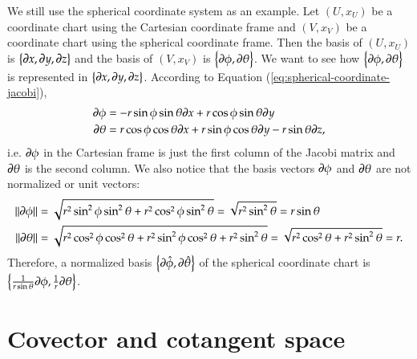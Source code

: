 \documentclass[11pt, a4paper]{book}
\begin{document}
\begin{Example}
  \label{exam:spherical-coordinate-basis}
  We still use the spherical coordinate system as an example. Let $(U,x_U)$ be a
  coordinate chart using the Cartesian coordinate frame and $(V,x_V)$ be a coordinate
  chart using the spherical coordinate frame. Then the basis of $(U,x_U)$ is
  $\left\{ \boldsymbol{\partial}x, \boldsymbol{\partial}y, \boldsymbol{\partial}z \right\}$ and the basis of
  $(V,x_V)$ is $\left\{ \boldsymbol{\partial}\phi, \boldsymbol{\partial}\theta \right\}$. We want to see
  how $\left\{ \boldsymbol{\partial}\phi, \boldsymbol{\partial}\theta \right\}$ is represented in $\left\{
    \boldsymbol{\partial}x, \boldsymbol{\partial}y, \boldsymbol{\partial}z \right\}$. According to Equation
  (\ref{eq:spherical-coordinate-jacobi}),
  \begin{equation}
    \begin{aligned}
      \boldsymbol{\partial}\phi &= -r\sin\phi \sin\theta \boldsymbol{\partial}x + r\cos\phi \sin\theta
      \boldsymbol{\partial}y \\
      \boldsymbol{\partial}\theta &= r\cos\phi\cos\theta \boldsymbol{\partial}x + r\sin\phi\cos\theta
      \boldsymbol{\partial}y - r\sin\theta \boldsymbol{\partial}z,
    \end{aligned}
  \end{equation}
  i.e. $\boldsymbol{\partial}\phi$ in the Cartesian frame is just the first column of the Jacobi
  matrix and $\boldsymbol{\partial}\theta$ is the second column. We also notice that the basis
  vectors $\boldsymbol{\partial}\phi$ and $\boldsymbol{\partial}\theta$ are not
  normalized or unit vectors:
  \begin{equation*}
    \begin{aligned}
      \lVert\boldsymbol{\partial}\phi\rVert &= \sqrt{r^2\sin^2\phi\sin^2\theta +
        r^2\cos^2\phi\sin^2\theta} = \sqrt{r^2\sin^2\theta} = r\sin\theta \\
      \lVert\boldsymbol{\partial}\theta\rVert &= \sqrt{r^2\cos^2\phi\cos^{2}\theta +
        r^2\sin^2\phi\cos^2\theta + r^2\sin^2\theta} = \sqrt{r^2\cos^2\theta +
        r^2\sin^2\theta} = r.
    \end{aligned}
  \end{equation*}
  Therefore, a normalized basis
  $\left\{ \boldsymbol{\partial}\hat{\phi}, \boldsymbol{\partial}\hat{\theta} \right\}$ of the spherical
  coordinate chart is
  $\left\{ \frac{1}{r\sin\theta} \boldsymbol{\partial}\phi, \frac{1}{r} \boldsymbol{\partial}\theta
  \right\}$.
\end{Example}

\section{Covector and cotangent space}
\end{document}
